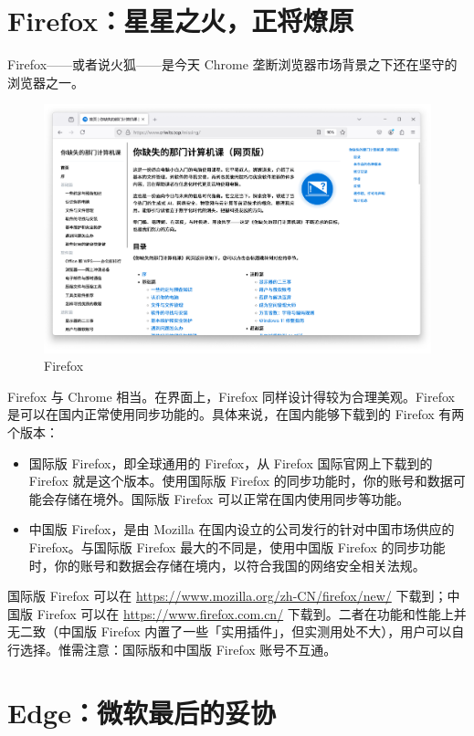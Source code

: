 \section{Firefox：星星之火，正将燎原}

Firefox——或者说火狐——是今天 Chrome 垄断浏览器市场背景之下还在坚守的浏览器之一。

\begin{figure}[htb!]
  \centering
  \includegraphics[width=.7\textwidth]{assets/software/Missing_homepage_in_Firefox.png}
  \caption{Firefox}
  \label{fig:Missing_homepage_in_Firefox}
\end{figure}

Firefox 与 Chrome 相当。在界面上，Firefox 同样设计得较为合理美观。Firefox 是可以在国内正常使用同步功能的。具体来说，在国内能够下载到的 Firefox 有两个版本：

\begin{itemize}
  \item 国际版 Firefox，即全球通用的 Firefox，从 Firefox 国际官网上下载到的 Firefox 就是这个版本。使用国际版 Firefox 的同步功能时，你的账号和数据可能会存储在境外。国际版 Firefox 可以正常在国内使用同步等功能。
  \item 中国版 Firefox，是由 Mozilla 在国内设立的公司发行的针对中国市场供应的 Firefox。与国际版 Firefox 最大的不同是，使用中国版 Firefox 的同步功能时，你的账号和数据会存储在境内，以符合我国的网络安全相关法规。
\end{itemize}

国际版 Firefox 可以在 \url{https://www.mozilla.org/zh-CN/firefox/new/} 下载到；中国版 Firefox 可以在 \url{https://www.firefox.com.cn/} 下载到。二者在功能和性能上并无二致（中国版 Firefox 内置了一些「实用插件」，但实测用处不大），用户可以自行选择。惟需注意：国际版和中国版 Firefox 账号不互通。

\section{Edge：微软最后的妥协}

